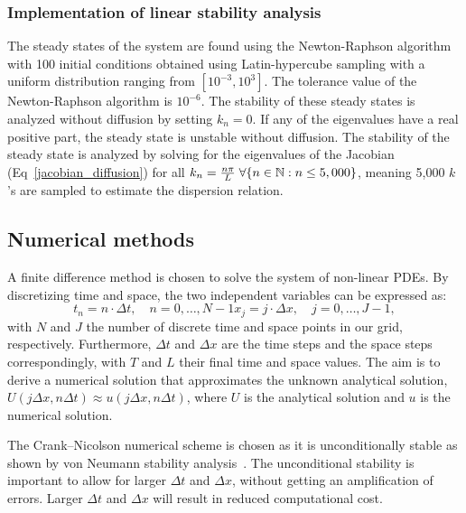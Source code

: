 \documentclass[10pt,letterpaper]{article}
\begin{document}
\subsubsection*{Implementation of linear stability analysis}
The steady states of the system are found using the Newton-Raphson algorithm with 100 initial conditions obtained using Latin-hypercube sampling with a uniform distribution ranging from $[10^{-3},10^3]$. The tolerance value of the Newton-Raphson algorithm is $10^{-6}$. The stability of these steady states is analyzed without diffusion by setting $k_{n}=0$. If any of the eigenvalues have a real positive part, the steady state is unstable without diffusion. The stability of the steady state is analyzed by solving for the eigenvalues of the Jacobian (Eq~\ref{jacobian_diffusion}) for all $k_{n}=\frac{n\pi}{L} \hspace{0.1cm}\forall \{n \in \mathbb{N}: n \leq 5,000\} $, meaning 5,000 $k$'s are sampled to estimate the dispersion relation. 


\subsection*{Numerical methods}\label{numerical methods}
A finite difference method is chosen to solve the system of non-linear PDEs. By discretizing time and space, the two independent variables can be expressed as:
\begin{subequations}
    \begin{equation}
        t_{n} = n \cdot \Delta t, \quad n=0,\dots,N-1
    \end{equation}
    \begin{equation}
        x_{j} = j \cdot \Delta x, \quad j=0, \dots,J-1,
    \end{equation}
\end{subequations}
with $N$ and $J$  the number of discrete time and space points in our grid, respectively. Furthermore, $\Delta t$ and $\Delta x$ are the time steps and the space steps correspondingly, with $T$ and $L$  their final time and space values. The aim is to derive a numerical solution that approximates the unknown analytical solution, $U(j\Delta x, n\Delta t)\approx u( j\Delta x, n\Delta t)$, where $U$ is the analytical solution and $u$ is the numerical solution.

The Crank–Nicolson numerical scheme is chosen as it is unconditionally stable as shown by von Neumann stability analysis~\cite{strikwerda2004finite}.
The unconditional stability is important to allow for larger $\Delta t$ and $\Delta x$, without getting an amplification of errors. Larger $\Delta t$ and $\Delta x$ will result in reduced computational cost.
\end{document}
